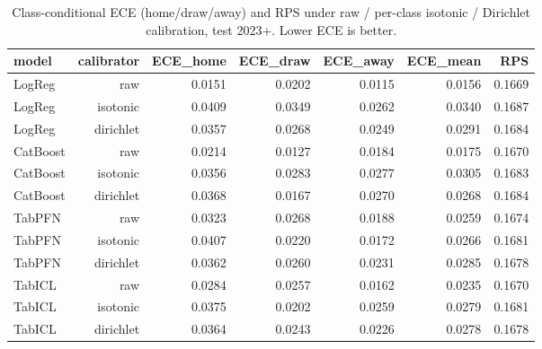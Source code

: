 \begin{table}[t]
  \centering
  \caption{Class-conditional ECE (home/draw/away) and RPS under raw / per-class isotonic / Dirichlet calibration, test 2023+. Lower ECE is better.}
  \label{tab:rev_calibration}
  \begin{tabular}{lrrrrrr}
  \toprule
  model & calibrator & ECE\_home & ECE\_draw & ECE\_away & ECE\_mean & RPS \\
  \midrule
  LogReg & raw & 0.0151 & 0.0202 & 0.0115 & 0.0156 & 0.1669 \\
  LogReg & isotonic & 0.0409 & 0.0349 & 0.0262 & 0.0340 & 0.1687 \\
  LogReg & dirichlet & 0.0357 & 0.0268 & 0.0249 & 0.0291 & 0.1684 \\
  CatBoost & raw & 0.0214 & 0.0127 & 0.0184 & 0.0175 & 0.1670 \\
  CatBoost & isotonic & 0.0356 & 0.0283 & 0.0277 & 0.0305 & 0.1683 \\
  CatBoost & dirichlet & 0.0368 & 0.0167 & 0.0270 & 0.0268 & 0.1684 \\
  TabPFN & raw & 0.0323 & 0.0268 & 0.0188 & 0.0259 & 0.1674 \\
  TabPFN & isotonic & 0.0407 & 0.0220 & 0.0172 & 0.0266 & 0.1681 \\
  TabPFN & dirichlet & 0.0362 & 0.0260 & 0.0231 & 0.0285 & 0.1678 \\
  TabICL & raw & 0.0284 & 0.0257 & 0.0162 & 0.0235 & 0.1670 \\
  TabICL & isotonic & 0.0375 & 0.0202 & 0.0259 & 0.0279 & 0.1681 \\
  TabICL & dirichlet & 0.0364 & 0.0243 & 0.0226 & 0.0278 & 0.1678 \\
  \bottomrule
  \end{tabular}
\end{table}
